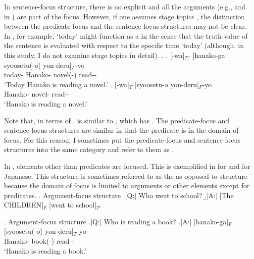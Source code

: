 In sentence-focus structure,
there is no explicit  and all the arguments (e.g.,  and  in \Last[A]) are part of the focus.
However, if one assumes stage topics \cite{erteschik-shir97,erteschik-shir07},
the distinction between the predicate-focus and the sentence-focus structures may not be clear.
In \Next[a], for example,
 `today' might function as a  in the sense that
the truth value of the sentence is evaluated with respect to the specific time `today' (although, in this study, I do not examine stage topics in detail).
\ex. 
	\ag. [-wa]$_{T?}$ [hanako-ga syoosetu(-o) yon-deru]$_{F}$-yo \\
		today- Hanako- novel(-) read-- \\
		`Today Hanako is reading a novel.'
		\bg. [-wa]$_{T}$ [syoosetu-o yon-deru]$_{F}$-yo \\
		Hanako- novel- read-- \\
		`Hanako is reading a novel.'

Note that, in terms of ,
\Last[a] is similar to \Last[b],
which has .
The predicate-focus and sentence-focus structures are similar
in that the predicate is in the domain of focus.
For this reason, I sometimes put the predicate-focus and sentence-focus structures into the same category
and refer to them as .

In ,
elements other than predicates are focused.
This is exemplified in \Next[A] for 
and \NNext[A] for Japanese.
This structure is sometimes referred to as the 
as opposed to  structure
because the domain of focus is limited to arguments or other elements except for predicates.
\ex. Argument-focus structure
	\a.[Q:] Who went to school?
	\b.[A:] [The CHILDREN]$_{F}$ [went to school]$_{T}$. \hfill{\cite[][p.\ 121]{lambrecht94}}

\ex. Argument-focus structure
	\a.[Q:] Who is reading a book?
	\bg.[A:] [hanako-ga]$_{F}$ [syoosetu(-o) yon-deru]$_{T}$-yo \\
		Hanako- book(-) read-- \\
		`Hanako is reading a book.'

